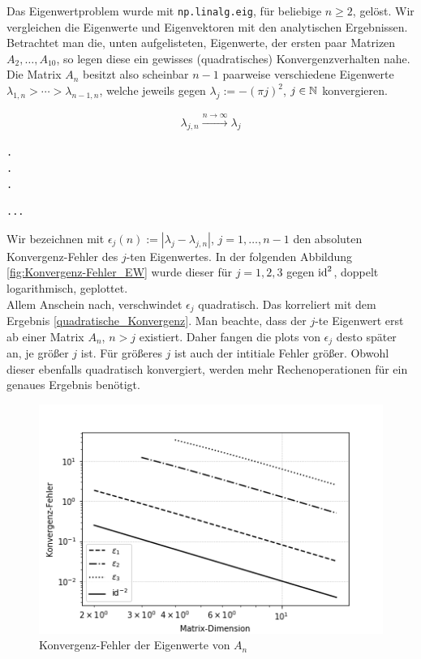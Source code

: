 Das Eigenwertproblem wurde mit \verb|np.linalg.eig|, für beliebige $n \geq 2$, gelöst. Wir vergleichen die Eigenwerte und Eigenvektoren mit den analytischen Ergebnissen. \\

Betrachtet man die, unten aufgelisteten, Eigenwerte, der ersten paar Matrizen $A_2, \ldots, A_{10}$, so legen diese ein gewisses (quadratisches) Konvergenzverhalten nahe. Die Matrix $A_n$ besitzt also scheinbar $n-1$ paarweise verschiedene Eigenwerte $\lambda_{1, n} > \cdots > \lambda_{n-1, n}$, welche jeweils gegen $\lambda_j := -(\pi j)^2$, $j \in \mathbb{N}$ konvergieren.

\begin{align*}
  \lambda_{j, n}
  \xrightarrow{n \to \infty}
  \lambda_j
\end{align*}

\begin{multicols}{3}



\begin{verbatim}
.
.
.
\end{verbatim}



\begin{verbatim}
...
\end{verbatim}

\end{multicols}

Wir bezeichnen mit $\epsilon_j(n) := |\lambda_j - \lambda_{j, n}|$, $j = 1, \ldots, n-1$ den absoluten Konvergenz-Fehler des $j$-ten Eigenwertes. In der folgenden Abbildung \ref{fig:Konvergenz-Fehler_EW} wurde dieser für $j = 1, 2, 3$ gegen $\text{id}^2$, doppelt logarithmisch, geplottet. \\

Allem Anschein nach, verschwindet $\epsilon_j$ quadratisch. Das korreliert mit dem Ergebnis \eqref{quadratische_Konvergenz}. Man beachte, dass der $j$-te Eigenwert erst ab einer Matrix $A_n$, $n > j$ existiert. Daher fangen die plots von $\epsilon_j$ desto später an, je größer $j$ ist. Für größeres $j$ ist auch der intitiale Fehler größer. Obwohl dieser ebenfalls quadratisch konvergiert, werden mehr Rechenoperationen für ein genaues Ergebnis benötigt. \\

\begin{figure}[h!]
  \centering
  \includegraphics[width = 0.5 \textwidth]{Aufgabe_2/images/plot_eigen_values(n_max = 16, eigen_amount = 3)}
  \caption{Konvergenz-Fehler der Eigenwerte von $A_n$}
  \label{Konvergenz-Fehler_EW}
\end{figure}

